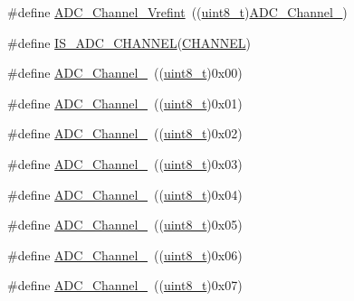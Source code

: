\begin{DoxyCompactItemize}
\#define \hyperlink{group___a_d_c__channels_ga5d48ded5138e6f1efe3a7634eff4d125}{A\+D\+C\+\_\+\+Channel\+\_\+\+Vrefint}~((\hyperlink{_p_e___types_8h_aba7bc1797add20fe3efdf37ced1182c5}{uint8\+\_\+t})\hyperlink{openmotestm_2library_2inc_2stm32f10x__adc_8h_a58cdfe3a5625f198116d163b09698cea}{A\+D\+C\+\_\+\+Channel\+\_})
\item 
\#define \hyperlink{group___a_d_c__channels_gaba41910dcb2b449c613a5ef638862e77}{I\+S\+\_\+\+A\+D\+C\+\_\+\+C\+H\+A\+N\+N\+EL}(\hyperlink{samr21__xpro_200std__low__power__mode_200std__low__power__mode_8c_ace6a11e892466500d47d1f45f042bc53}{C\+H\+A\+N\+N\+EL})
\item 
\#define \hyperlink{group___a_d_c__channels_ga40ec353803e9470a5721ef5bf0b1ab24}{A\+D\+C\+\_\+\+Channel\+\_}~((\hyperlink{_p_e___types_8h_aba7bc1797add20fe3efdf37ced1182c5}{uint8\+\_\+t})0x00)
\item 
\#define \hyperlink{group___a_d_c__channels_ga0b04cebf8d62085eca6dc7daa3d5d3f0}{A\+D\+C\+\_\+\+Channel\+\_}~((\hyperlink{_p_e___types_8h_aba7bc1797add20fe3efdf37ced1182c5}{uint8\+\_\+t})0x01)
\item 
\#define \hyperlink{group___a_d_c__channels_gabc66e2529583e11b591efd2df7070571}{A\+D\+C\+\_\+\+Channel\+\_}~((\hyperlink{_p_e___types_8h_aba7bc1797add20fe3efdf37ced1182c5}{uint8\+\_\+t})0x02)
\item 
\#define \hyperlink{group___a_d_c__channels_ga9f93cbacd030f1c79f96f8889b0cdee6}{A\+D\+C\+\_\+\+Channel\+\_}~((\hyperlink{_p_e___types_8h_aba7bc1797add20fe3efdf37ced1182c5}{uint8\+\_\+t})0x03)
\item 
\#define \hyperlink{group___a_d_c__channels_gafc7218417f729659dd8f06185cc2eafa}{A\+D\+C\+\_\+\+Channel\+\_}~((\hyperlink{_p_e___types_8h_aba7bc1797add20fe3efdf37ced1182c5}{uint8\+\_\+t})0x04)
\item 
\#define \hyperlink{group___a_d_c__channels_ga42822abae41faabde2a2da877e0cc854}{A\+D\+C\+\_\+\+Channel\+\_}~((\hyperlink{_p_e___types_8h_aba7bc1797add20fe3efdf37ced1182c5}{uint8\+\_\+t})0x05)
\item 
\#define \hyperlink{group___a_d_c__channels_ga7e24a73eec4aeb7d8e2f9008825ceacb}{A\+D\+C\+\_\+\+Channel\+\_}~((\hyperlink{_p_e___types_8h_aba7bc1797add20fe3efdf37ced1182c5}{uint8\+\_\+t})0x06)
\item 
\#define \hyperlink{group___a_d_c__channels_ga9723aa5fe6b9f4af1ffd3b90e6eef8d1}{A\+D\+C\+\_\+\+Channel\+\_}~((\hyperlink{_p_e___types_8h_aba7bc1797add20fe3efdf37ced1182c5}{uint8\+\_\+t})0x07)
\item 

\end{DoxyCompactItemize}
